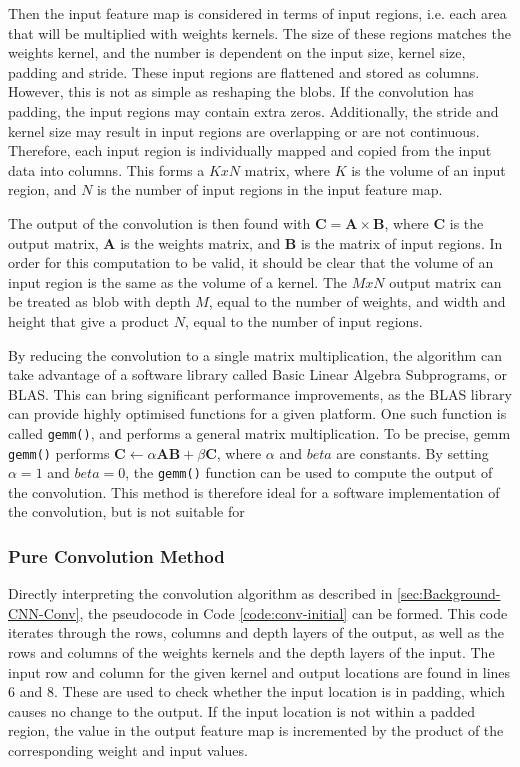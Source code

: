 \documentclass[12pt]{article}
\begin{document}
Then the input feature map is considered in terms of input regions, i.e. each area that will be multiplied with weights kernels. The size of these regions matches the weights kernel, and the number is dependent on the input size, kernel size, padding and stride.  These input regions are flattened and stored as columns. However, this is not as simple as reshaping the blobs. If the convolution has padding, the input regions may contain extra zeros. Additionally, the stride and kernel size may result in input regions are overlapping or are not continuous. Therefore, each input region is individually mapped and copied from the input data into columns. This forms a $KxN$ matrix, where $K$ is the volume of an input region, and $N$ is the number of input regions in the input feature map.

The output of the convolution is then found with \( \mathbf{C} = \mathbf{A}\times\mathbf{B}\), where $\mathbf{C}$ is the output matrix, $\mathbf{A}$ is the weights matrix, and $\mathbf{B}$ is the matrix of input regions. In order for this computation to be valid, it should be clear that the volume of an input region is the same as the volume of a kernel. The $MxN$ output matrix can be treated as blob with depth $M$, equal to the number of weights, and width and height that give a product $N$, equal to the number of input regions.

By reducing the convolution to a single matrix multiplication, the algorithm can take advantage of a software library called Basic Linear Algebra Subprograms, or BLAS. This can bring significant performance improvements, as the BLAS library can provide highly optimised functions for a given platform. One such function is called \lstinline|gemm()|, and performs a general matrix multiplication. To be precise, gemm \lstinline|gemm()| performs $\mathbf{C} \gets \alpha\mathbf{A}\mathbf{B} + \beta\mathbf{C}$, where $\alpha$ and $beta$ are constants. By setting $\alpha = 1$ and $beta = 0$, the \lstinline|gemm()| function can be used to compute the output of the convolution. This method is therefore ideal for a software implementation of the convolution, but is not suitable for 

\subsubsection{Pure Convolution Method}
\label{sec:Imp-Layers-Conv-PC}
\vspace{-12pt}
Directly interpreting the convolution algorithm as described in \ref{sec:Background-CNN-Conv}, the pseudocode in Code \ref{code:conv-initial} can be formed. This code iterates through the rows, columns and depth layers of the output, as well as the rows and columns of the weights kernels and the depth layers of the input. The input row and column for the given kernel and output locations are found in lines 6 and 8. These are used to check whether the input location is in padding, which causes no change to the output. If the input location is not within a padded region, the value in the output feature map is incremented by the product of the corresponding weight and input values.
\end{document}
